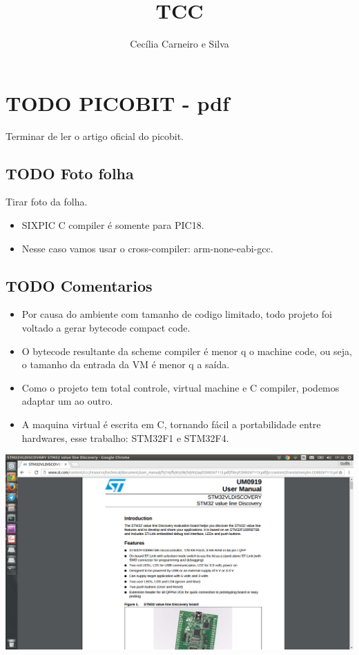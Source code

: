 \documentclass[11pt]{article}
\author{Cecília Carneiro e Silva}
\date{}
\title{TCC}
\begin{document}
\maketitle
\tableofcontents


\section{{\bfseries\sffamily TODO} PICOBIT - pdf}
\label{sec-1}

Terminar de ler o artigo oficial do picobit.

\subsection{{\bfseries\sffamily TODO} Foto folha}
\label{sec-1-1}

Tirar foto da folha.

\begin{itemize}
\item SIXPIC C compiler é somente para PIC18.
\item Nesse caso vamos usar o cross-compiler: arm-none-eabi-gcc.
\end{itemize}

\subsection{{\bfseries\sffamily TODO} Comentarios}
\label{sec-1-2}

\begin{itemize}
\item Por causa do ambiente com tamanho de codigo limitado, todo projeto foi voltado a gerar bytecode compact code.
\item O bytecode resultante da scheme compiler é menor q o machine code, ou seja, o tamanho da entrada da VM é menor q a saída.
\item Como o projeto tem total controle, virtual machine e C compiler, podemos adaptar um ao outro.
\item A maquina virtual é escrita em C, tornando fácil a portabilidade entre hardwares, esse trabalho: STM32F1 e STM32F4.
\end{itemize}

\includegraphics[width=.9\linewidth]{stm32f1.png}
\end{document}
